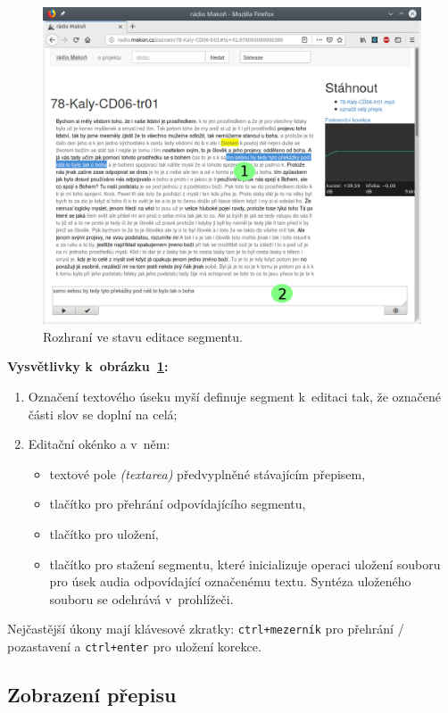 \begin{figure}[htpb]
\includegraphics[scale=0.65]{rc/radio-makon-cs-2-lab.png}
\caption{Rozhraní ve stavu editace segmentu.}
\label{fig:scn2lab}
\end{figure}

\textbf{Vysvětlivky k~obrázku~\ref{fig:scn2lab}:}
\begin{enumerate}
\item{
    Označení textového úseku myší definuje segment k~editaci tak, že označené
    části slov se doplní na celá;
}
\item{
    Editační okénko a v~něm:
    \begin{itemize}
    \item{textové pole {\em (textarea)} předvyplněné stávajícím přepisem,}
    \item{tlačítko pro přehrání odpovídajícího segmentu,}
    \item{tlačítko pro uložení,}
    \item{
        tlačítko pro stažení segmentu, které inicializuje operaci uložení
        souboru pro úsek audia odpovídající označenému textu. Syntéza uloženého
        souboru se odehrává v~prohlížeči.
    }
    \end{itemize}
}
\end{enumerate}

Nejčastější úkony mají klávesové zkratky: \texttt{ctrl+mezerník} pro
přehrání / pozastavení a \texttt{ctrl+enter} pro uložení korekce.

\subsection{Zobrazení přepisu}

